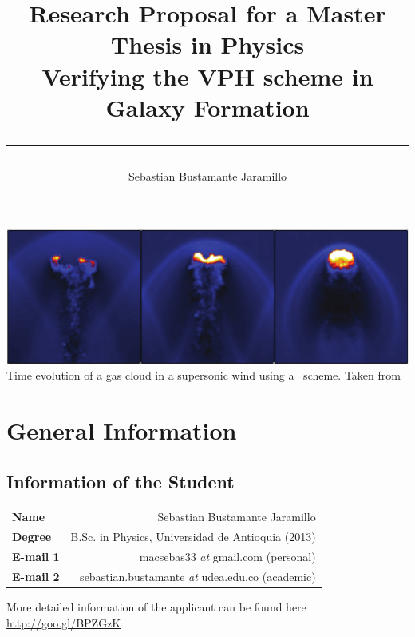 \documentclass[a4,useAMS,usenatbib,usegraphicx,12pt]{article}
\title{{\textbf{Research Proposal for a Master Thesis in Physics}}\\ 
				Verifying the VPH scheme in Galaxy Formation\\ 
				\color{black}\rule{15cm}{0.5mm}}
\author{Sebastian Bustamante Jaramillo}
\date{}
\begin{document}
\maketitle
\begin{center}
\includegraphics[trim = 0mm 3.5cm 0mm 3.0cm, clip, keepaspectratio=true,
width=0.7\textheight]{Presentation1.png}
\tiny{Time evolution of a gas cloud in a supersonic wind using a \VPH\ scheme.
Taken from \citep{Hess10}}
\end{center}
\tableofcontents
 
\newpage 

\section{General Information}
\small
\subsection*{Information of the Student}
\begin{tabular}{L!{\VRule}R}
\bf Name		& Sebastian Bustamante Jaramillo\\
\bf Degree		& B.Sc. in Physics, Universidad de Antioquia (2013)\\
\bf E-mail 1	& macsebas33 \textit{at} gmail.com (personal)\\
\bf E-mail 2	& sebastian.bustamante \textit{at} udea.edu.co (academic)\\
\end{tabular}

\vspace{10pt}

More detailed information of the applicant can be found here \url{http://goo.gl/BPZGzK}

\vspace{15pt}  
\end{document}
